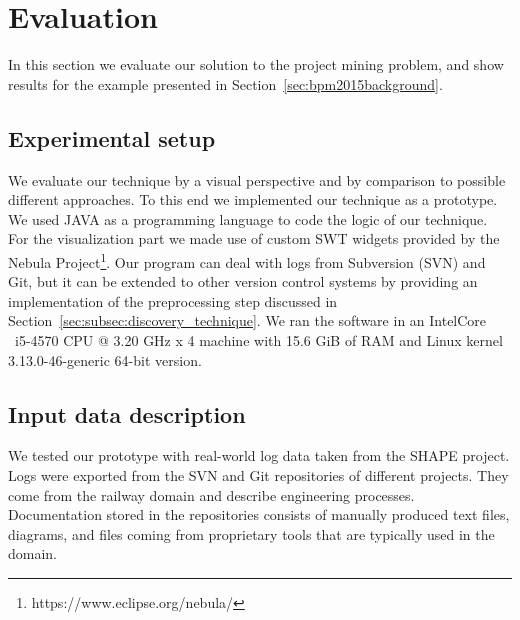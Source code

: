 \section{Evaluation}\label{sec:bpm2015evaluation}

In this section we evaluate our solution to the project mining problem, and show results for the example presented in Section~\ref{sec:bpm2015background}.

\subsection{Experimental setup}

%

We evaluate our technique by a visual perspective and by comparison to possible different approaches. To this end we implemented our technique as a prototype. We used JAVA as a programming language to code the logic of our technique. For the visualization part we made use of custom SWT widgets provided by the Nebula Project\footnote{https://www.eclipse.org/nebula/}. Our program can deal with logs from Subversion (SVN) \cite{pilato2008version} and Git\cite{torvalds2010git}, but it can be extended to other version control systems by providing an implementation of the preprocessing step discussed in Section~\ref{sec:subsec:discovery_technique}.
We ran the software in an Intel\textregistered Core \texttrademark~i5-4570 CPU @ 3.20 GHz x 4 machine with 15.6 GiB of RAM and Linux kernel 3.13.0-46-generic 64-bit version.

\subsection{Input data description}

We tested our prototype with real-world log data taken from the SHAPE project. Logs were exported from the SVN and Git repositories of different projects. They come from the railway domain and describe engineering processes. Documentation stored in the repositories consists of manually produced text files, diagrams, and files coming from proprietary tools that are typically used in the domain.

